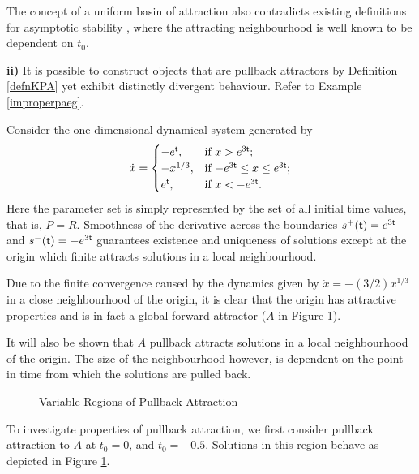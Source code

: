 The concept of a uniform basin of attraction also contradicts
existing definitions for asymptotic stability \cite{BhSz67,Yo66},
where the attracting neighbourhood is well known to be dependent
on $t_0$.

\textbf{ii)} It is possible to construct objects that are pullback attractors
by Definition \ref{defnKPA} yet exhibit distinctly divergent behaviour.
Refer to Example \ref{improperpaeg}.

\begin{example}\label{pavnhoodeg}
Consider the one dimensional dynamical system generated by
\begin{equation*}
  \dot{x} =
     \begin{cases}
       - e^{ \mathsf{\mathsf{t}}}, & \text{if $x > e^{3 \mathsf{\mathsf{t}}}$;} \\
       - x^{1/3}, & \text{if $-e^{3 \mathsf{\mathsf{t}}} \leq x \leq e^{3 \mathsf{\mathsf{t}}}$;} \\
       e^{ \mathsf{\mathsf{t}}}, & \text{if $x < -e^{3 \mathsf{\mathsf{t}}}$.} \\
     \end{cases}
\end{equation*}
Here the parameter set is simply represented by the set of all initial time
values, that is, $P = R$. Smoothness of the derivative across the boundaries
$s^+( \mathsf{\mathsf{t}}) = e^{3 \mathsf{\mathsf{t}}}$ and $s^-( \mathsf{\mathsf{t}}) = -e^{3 \mathsf{\mathsf{t}}}$ guarantees existence and uniqueness of
solutions except at the origin which finite attracts solutions in a local
neighbourhood.

Due to the finite convergence caused by the dynamics given by $\dot{x} =
-(3/2)x^{1/3}$ in a close neighbourhood of the origin, it is clear that the
origin has attractive properties and is in fact a global forward attractor
($A$ in Figure \ref{pavnhoodfig}).

It will also be shown that $A$ pullback attracts solutions in a
local neighbourhood of the origin. The size of the neighbourhood
however, is dependent on the point in time from which the
solutions are pulled back.

\begin{figure}[htb]
\begin{center}
 \caption{Variable Regions of Pullback
Attraction} \protect\label{pavnhoodfig}
\end{center}
\end{figure}

To investigate properties of pullback attraction, we first consider pullback attraction 
to $A$ at $t_0=0$, and $t_0 = -0.5$. Solutions in this region behave as depicted in Figure 
\ref{pavnhoodfig}.


\end{example}
